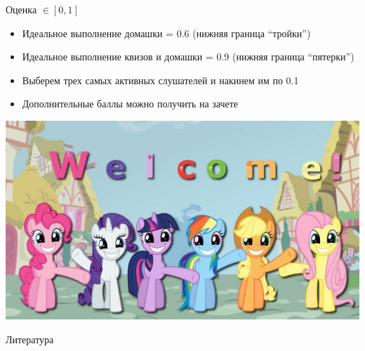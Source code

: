 \documentclass[11pt,aspectratio=169,handout]{beamer}
\begin{document}
\begin{frame}{Оценка $\in [0, 1]$}

\begin{itemize}
\item Идеальное выполнение домашки = 0.6 (нижняя граница ``тройки'')
\item Идеальное выполнение квизов и домашки = 0.9 (нижняя граница ``пятерки'')
\item Выберем трех самых активных слушателей и накинем им по 0.1
\item Дополнительные баллы можно получить на зачете
\end{itemize}

\end{frame}

\begin{frame}{}

\begin{center}
\includegraphics[scale=1.0]{images/welcome.jpeg}
\end{center}

\end{frame}

\begin{frame}[allowframebreaks]{Литература}


\end{frame}
\end{document}

